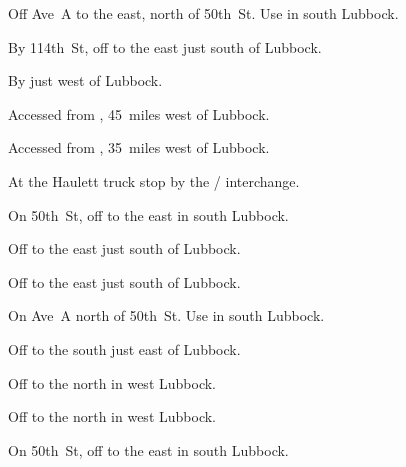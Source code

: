 

\begin{LocationList}

Off Ave~A to the east, north of 50th~St.
Use    in south Lubbock.

By 114th~St, off  to the east just south of Lubbock.

By  just west of Lubbock.

Accessed from , 45~miles west of Lubbock.

Accessed from , 35~miles west of Lubbock.

At the Haulett truck stop by the   /   interchange.

On 50th~St, off    to the east in south Lubbock.

Off  to the east just south of Lubbock.

Off  to the east just south of Lubbock.

On Ave~A north of 50th~St.
Use    in south Lubbock.

Off  to the south just east of Lubbock.

Off  to the north in west Lubbock.

Off  to the north in west Lubbock.

On 50th~St, off    to the east in south Lubbock.

\end{LocationList}
